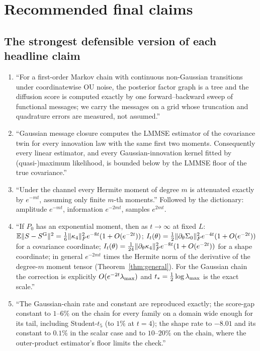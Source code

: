 \section{Recommended final claims}
\label{sec:claims}

\subsection{The strongest defensible version of each headline claim}

\begin{enumerate}
\item {} ``For a first-order Markov chain with continuous non-Gaussian transitions under coordinatewise OU noise, the posterior factor graph is a tree and the diffusion score is computed exactly by one forward--backward sweep of functional messages; we carry the messages on a grid whose truncation and quadrature errors are measured, not assumed.''
\item {} ``Gaussian message closure computes the LMMSE estimator of the covariance twin for every innovation law with the same first two moments. Consequently every linear estimator, and every Gaussian-innovation kernel fitted by (quasi-)maximum likelihood, is bounded below by the LMMSE floor of the true covariance.''
\item {} ``Under the channel every Hermite moment of degree $m$ is attenuated exactly by $e^{-mt}$, assuming only finite $m$-th moments.'' Followed by the dictionary: amplitude $e^{-mt}$, information $e^{-2mt}$, samples $e^{2mt}$.
\item {} ``If $P_0$ has an exponential moment, then as $t\to\infty$ at fixed $L$: $\mathbb{E}\|S-S^{\mathrm{G}}\|^2=\tfrac16\lVert \kappa_4 \rVert_{F}^2e^{-8t}(1+O(e^{-2t}))$; $I_t(\theta)=\tfrac12\lVert \partial_\theta\Sigma_0 \rVert_{F}^2e^{-4t}(1+O(e^{-2t}))$ for a covariance coordinate; $I_t(\theta)=\tfrac1{24}\lVert \partial_\theta\kappa_4 \rVert_{F}^2e^{-8t}(1+O(e^{-2t}))$ for a shape coordinate; in general $e^{-2mt}$ times the Hermite norm of the derivative of the degree-$m$ moment tensor (Theorem~\ref{thm:general}). For the Gaussian chain the correction is explicitly $O(e^{-2t}\lambda_{\max})$ and $t_\ast=\tfrac12\log\lambda_{\max}$ is the exact scale.''
\item {} ``The Gaussian-chain rate and constant are reproduced exactly; the score-gap constant to $1$--$6\%$ on the chain for every family on a domain wide enough for its tail, including Student-$t_5$ (to $1\%$ at $t=4$); the shape rate to $-8.01$ and its constant to $0.1\%$ in the scalar case and to $10$--$20\%$ on the chain, where the outer-product estimator's floor limits the check.''

\end{enumerate}
